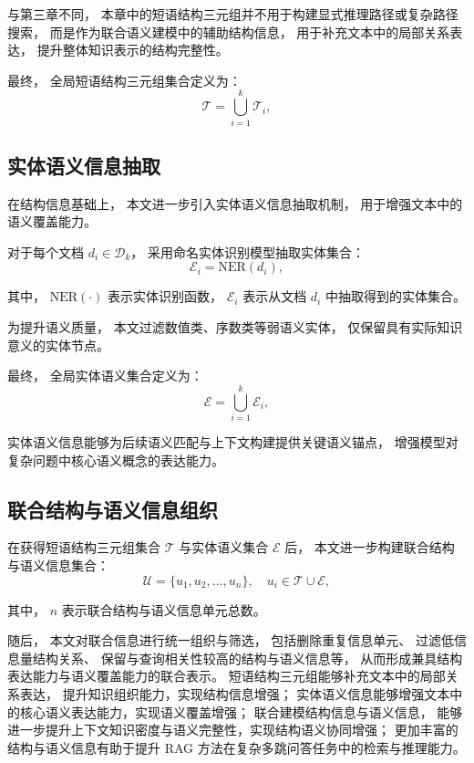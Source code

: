 与第三章不同，
本章中的短语结构三元组并不用于构建显式推理路径或复杂路径搜索，
而是作为联合语义建模中的辅助结构信息，
用于补充文本中的局部关系表达，
提升整体知识表示的结构完整性。

最终，
全局短语结构三元组集合定义为：
\begin{equation}
\mathcal{T} = \bigcup_{i=1}^{k}\mathcal{T}_i,
\end{equation}

\subsection{实体语义信息抽取}

在结构信息基础上，
本文进一步引入实体语义信息抽取机制，
用于增强文本中的语义覆盖能力。

对于每个文档 $d_i \in \mathcal{D}_k$，
采用命名实体识别模型抽取实体集合：
\begin{equation}
\mathcal{E}_i = \text{NER}(d_i),
\end{equation}

\noindent 其中，
$\text{NER}(\cdot)$ 表示实体识别函数，
$\mathcal{E}_i$ 表示从文档 $d_i$ 中抽取得到的实体集合。

为提升语义质量，
本文过滤数值类、序数类等弱语义实体，
仅保留具有实际知识意义的实体节点。

最终，
全局实体语义集合定义为：
\begin{equation}
\mathcal{E} = \bigcup_{i=1}^{k}\mathcal{E}_i,
\end{equation}

实体语义信息能够为后续语义匹配与上下文构建提供关键语义锚点，
增强模型对复杂问题中核心语义概念的表达能力。

\subsection{联合结构与语义信息组织}

在获得短语结构三元组集合 $\mathcal{T}$ 与实体语义集合 $\mathcal{E}$ 后，
本文进一步构建联合结构与语义信息集合：
\begin{equation}
\mathcal{U}=\{u_1,u_2,\dots,u_n\},
\quad
u_i \in \mathcal{T}\cup\mathcal{E},
\end{equation}

\noindent 其中，
$n$ 表示联合结构与语义信息单元总数。

随后，
本文对联合信息进行统一组织与筛选，
包括删除重复信息单元、
过滤低信息量结构关系、
保留与查询相关性较高的结构与语义信息等，
从而形成兼具结构表达能力与语义覆盖能力的联合表示。
短语结构三元组能够补充文本中的局部关系表达，
提升知识组织能力，实现结构信息增强；
实体语义信息能够增强文本中的核心语义表达能力，实现语义覆盖增强；
联合建模结构信息与语义信息，
能够进一步提升上下文知识密度与语义完整性，实现结构语义协同增强；
更加丰富的结构与语义信息有助于提升 RAG 方法在复杂多跳问答任务中的检索与推理能力。

